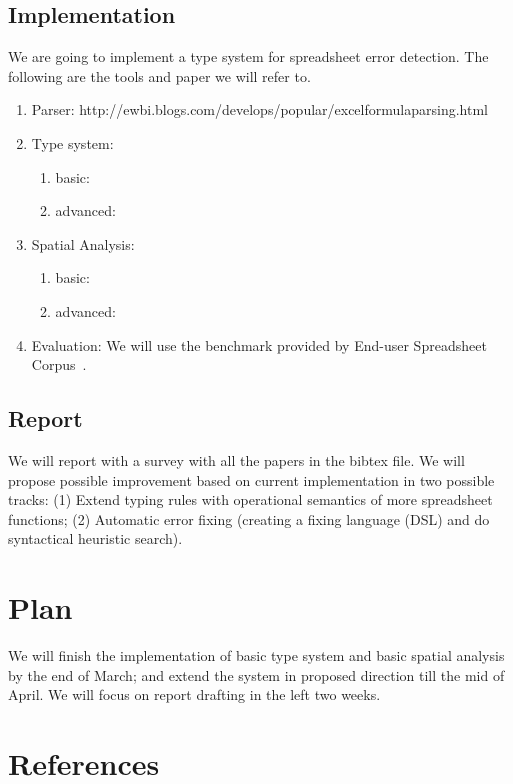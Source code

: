 \documentclass[a4paper]{article}
\begin{document}
\subsection{Implementation}
We are going to implement a type system for spreadsheet error detection. The following are the tools and paper we will refer to.
\begin{enumerate}
\item Parser: http://ewbi.blogs.com/develops/popular/excelformulaparsing.html
\item Type system:
  \begin{enumerate}
	\item basic: \cite{Abraham2006}
    \item advanced: \cite{Cunha2015}
  \end{enumerate}
\item Spatial Analysis:
  \begin{enumerate}
	\item basic: \cite{Abraham2004}
    \item advanced: \cite{Chambers2009a}
  \end{enumerate}
\item Evaluation: We will use the benchmark provided by End-user Spreadsheet Corpus~\cite{fisher2005euses}.
\end{enumerate}

\subsection{Report}
We will report with a survey with all the papers in the bibtex file. We will propose possible improvement based on current implementation in two possible tracks: (1) Extend typing rules with operational semantics of more spreadsheet functions; (2) Automatic error fixing (creating a fixing language (DSL) and do syntactical heuristic search).

\section{Plan}
We will finish the implementation of basic type system and basic spatial analysis by the end of March; and extend the system in proposed direction till the mid of April.
We will focus on report drafting in the left two weeks.

\section{References}

% 
% 
\end{document}
